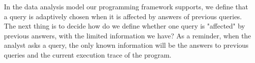 In the data analysis model our programming framework supports, 
   we define that a query is adaptively chosen when it is affected by answers of previous queries. The next thing is to decide how do we define whether one query is "affected" by previous answers, 
   with the limited information we have? 
   As a reminder, 
  when the analyst asks a query, the only known information will be the answers to previous queries and the current execution trace of the program.
 
